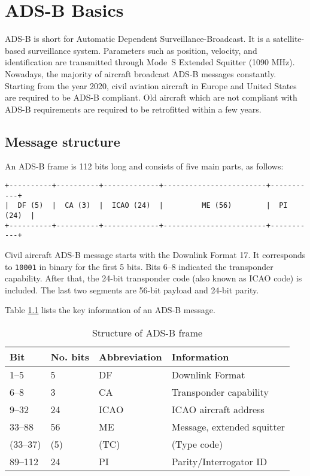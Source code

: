 \chapter{ADS-B Basics} \label{chap:adsb-basic}
ADS-B is short for Automatic Dependent Surveillance-Broadcast. It is a satellite-based surveillance system. Parameters such as position, velocity, and identification are transmitted through Mode~S Extended Squitter (1090 MHz). Nowadays, the majority of aircraft broadcast ADS-B messages constantly. Starting from the year 2020, civil aviation aircraft in Europe and United States are required to be ADS-B compliant. Old aircraft which are not compliant with ADS-B requirements are required to be retrofitted within a few years.

\section{Message structure}

An ADS-B frame is 112 bits long and consists of five main parts, as follows:

\begin{verbatim}
+----------+----------+-------------+------------------------+-----------+
|  DF (5)  |  CA (3)  |  ICAO (24)  |         ME (56)        |  PI (24)  |
+----------+----------+-------------+------------------------+-----------+
\end{verbatim}

Civil aircraft ADS-B message starts with the Downlink Format 17. It corresponds to \texttt{10001} in binary for the first 5 bits. Bits 6--8 indicated the transponder capability. After that, the 24-bit transponder code (also known as ICAO code) is included. The last two segments are 56-bit payload and 24-bit parity.

Table \ref{tb:adsb-structure} lists the key information of an ADS-B message.

\begin{table}[!ht]
\centering
\caption{Structure of ADS-B frame}
\label{tb:adsb-structure}
\begin{tabular}{|l|l|l|l|}
\hline
\textbf{Bit} & \textbf{No. bits} & \textbf{Abbreviation} & \textbf{Information} \\ \hline\hline
1--5 & 5 & DF & Downlink Format \\ \hline
6--8 & 3 & CA & Transponder capability \\ \hline
9--32 & 24 & ICAO & ICAO aircraft address \\ \hline
33--88 & 56 & ME & Message, extended squitter \\
(33--37) & (5) & (TC) & (Type code) \\ \hline
89--112 & 24 & PI & Parity/Interrogator ID \\ \hline
\end{tabular}
\end{table}

